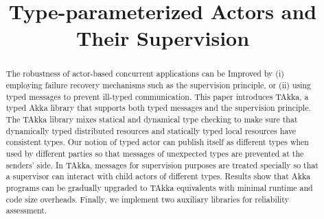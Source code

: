 \documentclass{llncs}
\begin{document}
%
\frontmatter          %
\title{Type-parameterized Actors and Their Supervision 
}





%



%



\maketitle



\begin{abstract} 
The robustness of actor-based concurrent applications can be Improved by (i) 
employing failure recovery mechanisms such as the supervision principle, or (ii) 
using typed messages to prevent ill-typed communication. This paper introduces 
TAkka, a typed Akka library that supports both typed messages and the 
supervision principle. The TAkka library mixes statical and dynamical type 
checking to make sure that dynamically typed distributed resources and 
statically typed local resources have consistent types. Our notion of typed 
actor can publish itself as different types when used by different parties so 
that messages of unexpected types are prevented at the senders' side. In TAkka, 
messages for supervision purposes are treated specially so that a supervisor can 
interact with child actors of different types. Results show that Akka programs 
can be gradually upgraded to TAkka equivalents with minimal runtime and code 
size overheads. Finally, we implement two auxiliary libraries for 
reliability assessment.
\end{abstract}
\end{document}
